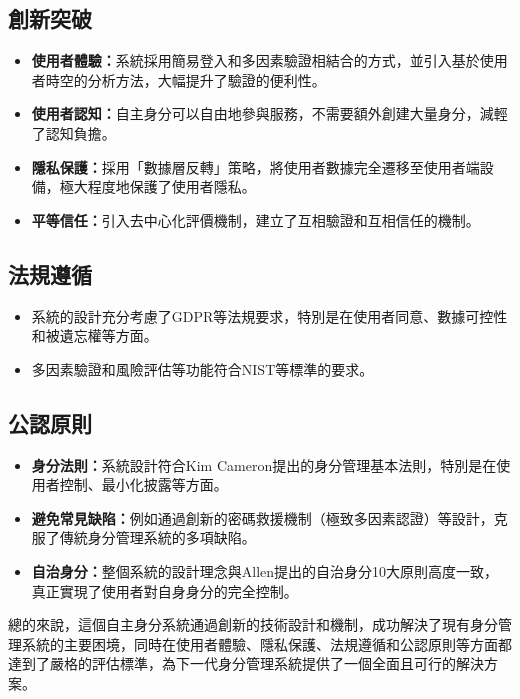 \subsection{創新突破}
\begin{itemize}
  \item \textbf{使用者體驗：}系統採用簡易登入和多因素驗證相結合的方式，並引入基於使用者時空的分析方法，大幅提升了驗證的便利性。
  \item \textbf{使用者認知：}自主身分可以自由地參與服務，不需要額外創建大量身分，減輕了認知負擔。
  \item \textbf{隱私保護：}採用「數據層反轉」策略，將使用者數據完全遷移至使用者端設備，極大程度地保護了使用者隱私。
  \item \textbf{平等信任：}引入去中心化評價機制，建立了互相驗證和互相信任的機制。
\end{itemize}
\subsection{法規遵循}
\begin{itemize}
  \item 系統的設計充分考慮了GDPR等法規要求，特別是在使用者同意、數據可控性和被遺忘權等方面。
  \item 多因素驗證和風險評估等功能符合NIST等標準的要求。
\end{itemize}
\subsection{公認原則}
\begin{itemize}
  \item \textbf{身分法則：}系統設計符合Kim Cameron提出的身分管理基本法則，特別是在使用者控制、最小化披露等方面。
  \item \textbf{避免常見缺陷：}例如通過創新的密碼救援機制（極致多因素認證）等設計，克服了傳統身分管理系統的多項缺陷。
  \item \textbf{自治身分：}整個系統的設計理念與Allen提出的自治身分10大原則高度一致，真正實現了使用者對自身身分的完全控制。
\end{itemize}
總的來說，這個自主身分系統通過創新的技術設計和機制，成功解決了現有身分管理系統的主要困境，同時在使用者體驗、隱私保護、法規遵循和公認原則等方面都達到了嚴格的評估標準，為下一代身分管理系統提供了一個全面且可行的解決方案。
